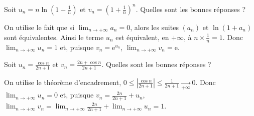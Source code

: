 \begin{question}

Soit $\displaystyle u_n=n\ln\left(1+\frac{1}{n}\right)$ et $\displaystyle v_n=\left(1+\frac{1}{n}\right)^n$. Quelles sont les bonnes réponses ?
\begin{answers}  
\end{answers}
\begin{explanations}
On utilise le fait que si $\displaystyle \lim _{n\to +\infty}a_n=0$, alors les suites $(a_n)$ et $\ln (1+a_n)$ sont équivalentes. Ainsi le terme $u_n$ est équivalent, en $+\infty$, à $\displaystyle n\times \frac{1}{n}=1$. Donc $\displaystyle \lim _{n\to +\infty}u_n=1$ et, puisque $v_n=\mathrm{e}^{u_n}$, $\displaystyle \lim _{n\to +\infty}v_n=\mathrm{e}$.
\end{explanations}
\end{question}



\begin{question}

Soit $\displaystyle u_n=\frac{\cos n}{2n+1}$ et $\displaystyle v_n=\frac{2n+\cos n}{2n+1}$. Quelles sont les bonnes réponses ?
\begin{answers}  
\end{answers}
\begin{explanations}
On utilise le théorème d'encadrement, $\displaystyle 0\leq \left|\frac{\cos n}{2n+1}\right|\leq \frac{1}{2n+1}\underset{+\infty}{\longrightarrow }0$. Donc $\displaystyle \lim _{n\to +\infty}u_n=0$ et, puisque $\displaystyle v_n=\frac{2n}{2n+1}+u_n$, $\displaystyle \lim _{n\to +\infty}v_n=\lim _{n\to +\infty}\frac{2n}{2n+1}+\lim _{n\to +\infty}u_n=1$.
\end{explanations}
\end{question}



